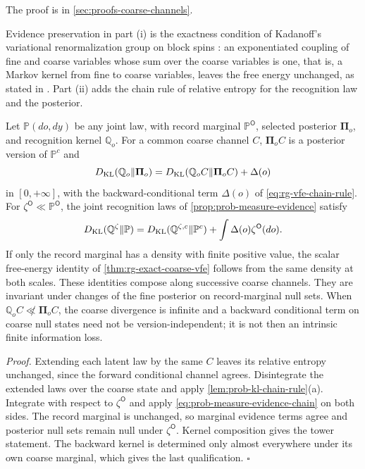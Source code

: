 The proof is in \cref{sec:proofs-coarse-channels}.

Evidence preservation in part (i) is the exactness condition of Kadanoff's variational
renormalization group on block spins \citep{kadanoff1966scaling}: an exponentiated coupling of fine
and coarse variables whose sum over the coarse variables is one, that is, a Markov kernel from fine
to coarse variables, leaves the free energy unchanged, as stated in
\citet[Eqs.~(8)--(9)]{MehtaSchwab2014}. Part (ii) adds the chain rule of relative entropy for the
recognition law and the posterior.

Let $\mathbb P(do,dy)$ be any joint law, with record marginal
$\mathbb P^{\mathsf O}$, selected posterior $\boldsymbol\Pi_o$, and
recognition kernel $\mathbb Q_o$. For a common coarse channel $C$,
$\boldsymbol\Pi_oC$ is a posterior version of $\mathbb P^c$ and
\begin{equation}
D_{\mathrm{KL}}(\mathbb Q_o\Vert\boldsymbol\Pi_o)
=D_{\mathrm{KL}}(\mathbb Q_oC\Vert\boldsymbol\Pi_oC)+\Delta(o)
\label{eq:cg-measure-posterior-chain}
\end{equation}
in $[0,+\infty]$, with the backward-conditional term $\Delta(o)$ of
\eqref{eq:rg-vfe-chain-rule}. For $\zeta^{\mathsf O}\ll\mathbb P^{\mathsf O}$,
the joint recognition laws of \cref{prop:prob-measure-evidence} satisfy
\begin{equation}
D_{\mathrm{KL}}(\mathbb Q^\zeta\Vert\mathbb P)
=D_{\mathrm{KL}}(\mathbb Q^{\zeta,c}\Vert\mathbb P^c)
+\int\Delta(o)\zeta^{\mathsf O}(do).
\label{eq:cg-measure-joint-chain}
\end{equation}
If only the record marginal has a density with finite positive value,
the scalar free-energy identity of \cref{thm:rg-exact-coarse-vfe} follows
from the same density at both scales. These identities compose along
successive coarse channels. They are invariant under changes of the
fine posterior on record-marginal null sets. When
$\mathbb Q_oC\not\ll\boldsymbol\Pi_oC$, the coarse divergence is infinite
and a backward conditional term on coarse null states need not be
version-independent; it is not then an intrinsic finite information loss.

\noindent\emph{Proof.}
Extending each latent law by the same $C$ leaves its relative entropy
unchanged, since the forward conditional channel agrees. Disintegrate
the extended laws over the coarse state and apply
\cref{lem:prob-kl-chain-rule}(a). Integrate with respect to
$\zeta^{\mathsf O}$ and apply
\eqref{eq:prob-measure-evidence-chain} on both sides. The record marginal
is unchanged, so marginal evidence terms agree and posterior null sets
remain null under $\zeta^{\mathsf O}$. Kernel composition gives the tower
statement. The backward kernel is determined only almost everywhere under
its own coarse marginal, which gives the last qualification.
\hfill$\square$

